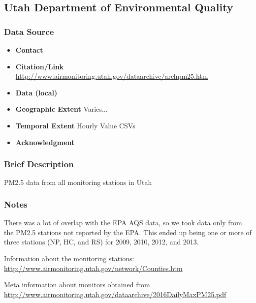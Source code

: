 \subsection{Utah Department of Environmental Quality }

\subsubsection*{Data Source}

\begin{itemize}[nolistsep]
\item \textbf{Contact} 
\item \textbf{Citation/Link} \url{http://www.airmonitoring.utah.gov/dataarchive/archpm25.htm}
\item \textbf{Data (local)} 
\item \textbf{Geographic Extent} Varies... 
\item \textbf{Temporal Extent} Hourly Value CSVs
\item \textbf{Acknowledgment} 
\end{itemize}

\subsubsection*{Brief Description} 
PM2.5 data from all monitoring stations in Utah

\subsubsection*{Notes} 
There was a lot of overlap with the EPA AQS data, so we took data only from the PM2.5 stations not reported by the EPA. 
This ended up being one or more of three stations (NP, HC, and RS) for 2009, 2010, 2012, and 2013.

Information about the monitoring stations: \url{ http://www.airmonitoring.utah.gov/network/Counties.htm } 

Meta information about monitors obtained from \url{http://www.airmonitoring.utah.gov/dataarchive/2016DailyMaxPM25.pdf}







